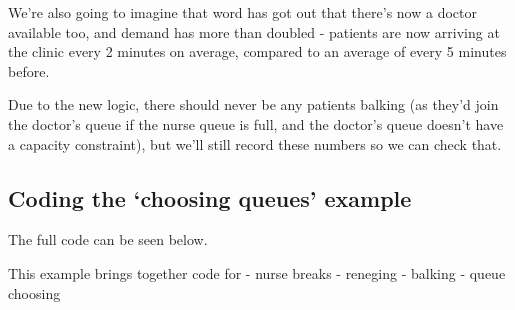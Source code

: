 \documentclass[
  letterpaper,
  DIV=11,
  numbers=noendperiod]{scrreprt}
\begin{document}
We're also going to imagine that word has got out that there's now a
doctor available too, and demand has more than doubled - patients are
now arriving at the clinic every 2 minutes on average, compared to an
average of every 5 minutes before.

Due to the new logic, there should never be any patients balking (as
they'd join the doctor's queue if the nurse queue is full, and the
doctor's queue doesn't have a capacity constraint), but we'll still
record these numbers so we can check that.

\subsection{Coding the `choosing queues'
example}\label{coding-the-choosing-queues-example}

The full code can be seen below.

This example brings together code for - nurse breaks - reneging -
balking - queue choosing
\end{document}
